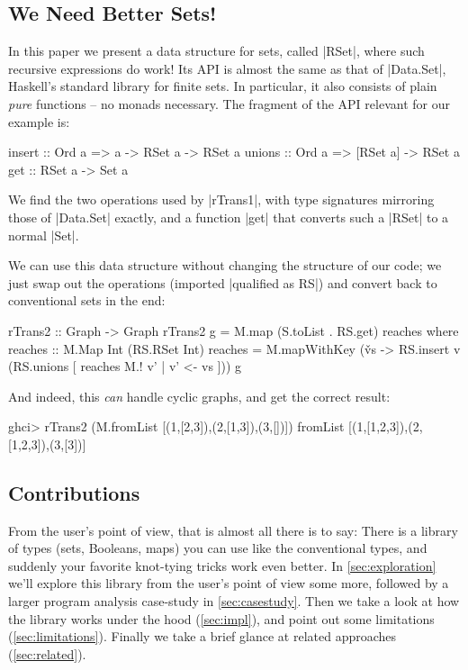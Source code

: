 \documentclass[manuscript,screen,acmsmall,nonacm]{acmart}
\begin{document}
\subsection{We Need Better Sets!}

In this paper we present a data structure for sets, called |RSet|, where such recursive expressions do work! Its API is almost the same as that of |Data.Set|, Haskell's standard library for finite sets. In particular, it also consists of plain \emph{pure} functions -- no monads necessary. The fragment of the API relevant for our example is:
\begin{code}
insert  :: Ord a =>  a -> RSet a  -> RSet a
unions  :: Ord a =>  [RSet a]     -> RSet a
get     ::           RSet a       -> Set a
\end{code}
We find the two operations used by |rTrans1|, with type signatures mirroring those of |Data.Set| exactly, and a function |get| that converts such a |RSet| to a normal |Set|.

We can use this data structure without changing the structure of our code; we just swap out the operations (imported |qualified as RS|) and convert back to conventional sets in the end:
\begin{code}
rTrans2 :: Graph -> Graph
rTrans2 g = M.map (S.toList . RS.get) reaches
  where
    reaches :: M.Map Int (RS.RSet Int)
    reaches = M.mapWithKey (\v vs -> RS.insert v (RS.unions [ reaches M.! v' | v' <- vs ])) g
\end{code}

And indeed, this \emph{can} handle cyclic graphs, and get the correct result:
\begin{code}
ghci> rTrans2 (M.fromList [(1,[2,3]),(2,[1,3]),(3,[])])
fromList [(1,[1,2,3]),(2,[1,2,3]),(3,[3])]
\end{code}

\subsection{Contributions}

From the user’s point of view, that is almost all there is  to say: There is a library of types (sets, Booleans, maps) you can use like the conventional types, and suddenly your favorite knot-tying tricks work even better. In \cref{sec:exploration} we'll explore this library from the user's point of view some more, followed by a larger program analysis case-study in \cref{sec:casestudy}. Then we take a look at how the library works under the hood (\cref{sec:impl}), and point out some limitations (\cref{sec:limitations}). Finally we take a brief glance at related approaches (\cref{sec:related}).
\end{document}
